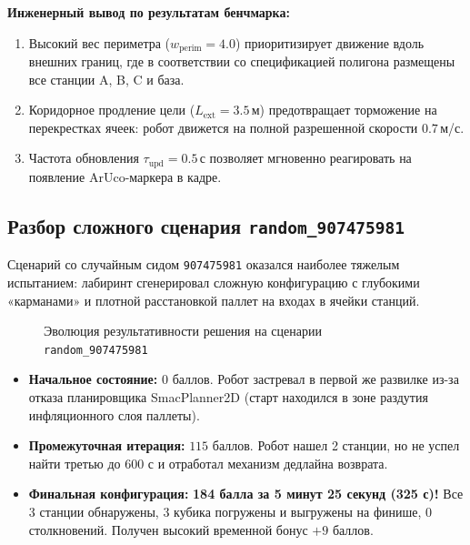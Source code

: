 \documentclass[a4paper,11pt]{article}
\begin{document}
\textbf{Инженерный вывод по результатам бенчмарка:}
\begin{enumerate}
    \item Высокий вес периметра ($w_{\text{perim}} = 4.0$) приоритизирует движение вдоль внешних границ, где в соответствии со спецификацией полигона размещены все станции A, B, C и база.
    \item Коридорное продление цели ($L_{\text{ext}} = 3.5$\,м) предотвращает торможение на перекрестках ячеек: робот движется на полной разрешенной скорости $0.7$\,м/с.
    \item Частота обновления $\tau_{\text{upd}} = 0.5$\,с позволяет мгновенно реагировать на появление ArUco-маркера в кадре.
\end{enumerate}

\subsection{Разбор сложного сценария \texttt{random\_907475981}}
Сценарий со случайным сидом \texttt{907475981} оказался наиболее тяжелым испытанием: лабиринт сгенерировал сложную конфигурацию с глубокими «карманами» и плотной расстановкой паллет на входах в ячейки станций.

\begin{figure}[htbp]
\centering
{}
\caption{Эволюция результативности решения на сценарии \texttt{random\_907475981}}
\label{fig:score_progress}
\end{figure}

\begin{itemize}
    \item \textbf{Начальное состояние:} $0$ баллов. Робот застревал в первой же развилке из-за отказа планировщика SmacPlanner2D (старт находился в зоне раздутия инфляционного слоя паллеты).
    \item \textbf{Промежуточная итерация:} $115$ баллов. Робот нашел 2 станции, но не успел найти третью до 600 с и отработал механизм дедлайна возврата.
    \item \textbf{Финальная конфигурация:} \textbf{184 балла за 5 минут 25 секунд (325 с)!} Все 3 станции обнаружены, 3 кубика погружены и выгружены на финише, 0 столкновений. Получен высокий временной бонус $+9$ баллов.
\end{itemize}
\end{document}
